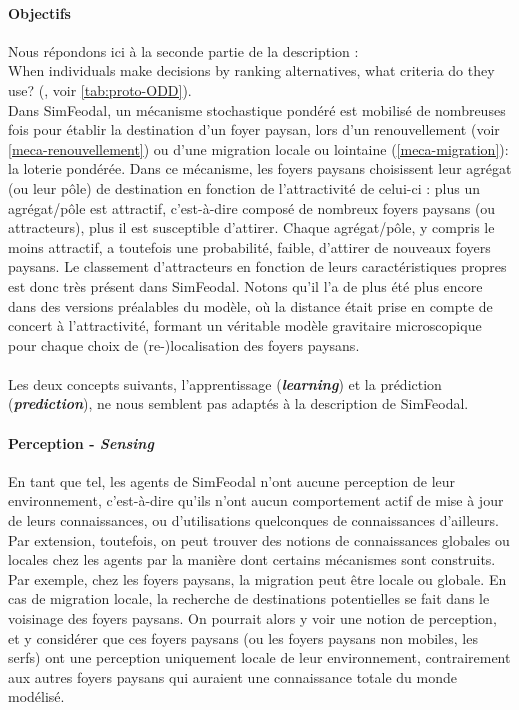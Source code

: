 \paragraph{Objectifs} Nous répondons ici à la seconde partie de la description :\\
\og When individuals make decisions by ranking alternatives, what criteria do they use?\fg{} (\textcite{grimm_documenting_2017}, voir \cref{tab:proto-ODD}).\\
Dans SimFeodal, un mécanisme stochastique pondéré est mobilisé de nombreuses fois pour établir la destination d'un foyer paysan, lors d'un renouvellement (voir \cref{meca-renouvellement}) ou d'une migration locale ou lointaine (\cref{meca-migration}): la \og loterie pondérée\fg{}.
Dans ce mécanisme, les foyers paysans \og choisissent\fg{} leur agrégat (ou leur pôle) de destination en fonction de l'attractivité de celui-ci :
plus un agrégat/pôle est attractif, c'est-à-dire composé de nombreux foyers paysans (ou attracteurs), plus il est susceptible d'attirer. Chaque agrégat/pôle, y compris le moins attractif, a toutefois une probabilité, faible, d'attirer de nouveaux foyers paysans.
Le classement d'attracteurs en fonction de leurs caractéristiques propres est donc très présent dans SimFeodal.
Notons qu'il l'a de plus été plus encore dans des versions préalables du modèle, où la distance était prise en compte de concert à l'attractivité, formant un véritable modèle gravitaire microscopique pour chaque choix de (re-)localisation des foyers paysans.

\paragraph[Learning \& Prediction]{} Les deux concepts suivants, l'apprentissage (\textit{\textbf{learning}}) et la prédiction (\textit{\textbf{prediction}}), ne nous semblent pas adaptés à la description de SimFeodal.

\paragraph{Perception - \textit{Sensing}} En tant que tel, les agents de SimFeodal n'ont aucune perception de leur environnement, c'est-à-dire qu'ils n'ont aucun comportement \og actif\fg{} de mise à jour de leurs connaissances, ou d'utilisations quelconques de connaissances d'ailleurs.
Par extension, toutefois, on peut trouver des notions de connaissances globales ou locales chez les agents par la manière dont certains mécanismes sont construits. Par exemple, chez les foyers paysans, la migration peut être locale ou globale. En cas de migration locale, la recherche de destinations potentielles se fait dans le voisinage des foyers paysans.
On pourrait alors y voir une notion de perception, et y considérer que ces foyers paysans (ou les foyers paysans non mobiles, les serfs) ont une perception uniquement locale de leur environnement, contrairement aux autres foyers paysans qui auraient une connaissance totale du monde modélisé.

